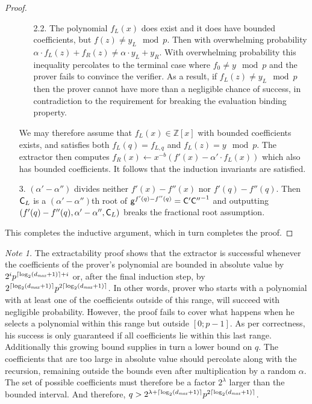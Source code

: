 \documentclass{article}
\theoremstyle{definition}
\begin{document}
\begin{proof}
\begin{itemize}
\begin{itemize}
        \item[2.2.] The polynomial $f_L(x)$ does exist and it does have bounded coefficients, but $f(z) \neq y_L \mod p$. Then with overwhelming probability $\alpha \cdot f_L(z) + f_R(z) \neq \alpha \cdot y_L + y_R$. With overwhelming probability this inequality percolates to the terminal case where $f_0 \neq y \mod p$ and the prover fails to convince the verifier. As a result, if $f_L(z) \neq y_L \mod p$ then the prover cannot have more than a negligible chance of success, in contradiction to the requirement for breaking the evaluation binding property.
    \end{itemize}
    \item[] We may therefore assume that $f_L(x) \in \mathbb{Z}[x]$ with bounded coefficients exists, and satisfies both $f_L(q) = f_{L,q}$ and $f_L(z) = y \mod p$. The extractor then computes $f_R(x) \leftarrow x^{-b}(f'(x) - \alpha' \cdot f_L(x))$ which also has bounded coefficients. It follows that the induction invariants are satisfied.
    \item[3.] $(\alpha' - \alpha'')$ divides neither $f'(x) - f''(x)$ nor $f'(q) - f''(q)$. Then $\mathsf{C}_L$ is a $(\alpha' - \alpha'')$th root of $\mathsf{g}^{f'(q) - f''(q)} = \mathsf{C}'{\mathsf{C}''}^{-1}$ and outputting $(f'(q) - f''(q), \alpha'-\alpha'', \mathsf{C}_L)$ breaks the fractional root assumption.
\end{itemize}
This completes the inductive argument, which in turn completes the proof.
\end{proof}

{\it Note 1.} The extractability proof shows that the extractor is successful whenever the coefficients of the prover's polynomial are bounded in absolute value by $2^ip^{\lceil \log_2(d_{\it max} + 1) \rceil+i}$ or, after the final induction step, by $2^{\lceil \log_2(d_{\it max} + 1) \rceil}p^{2\lceil \log_2(d_{\it max} + 1) \rceil}$. In other words, prover who starts with a polynomial with at least one of the coefficients outside of this range, will succeed with negligible probability. However, the proof fails to cover what happens when he selects a polynomial within this range but outside $[0;p-1]$. As per correctness, his success is only guaranteed if all coefficients lie within this last range. Additionally this growing bound supplies in turn a lower bound on $q$. The coefficients that are too large in absolute value should percolate along with the recursion, remaining outside the bounds even after multiplication by a random $\alpha$. The set of possible coefficients must therefore be a factor $2^\lambda$ larger than the bounded interval. And therefore, $q > 2^{\lambda + \lceil \log_2(d_{\it max} + 1) \rceil}p^{2\lceil \log_2(d_{\it max} + 1) \rceil}$.
\end{document}
